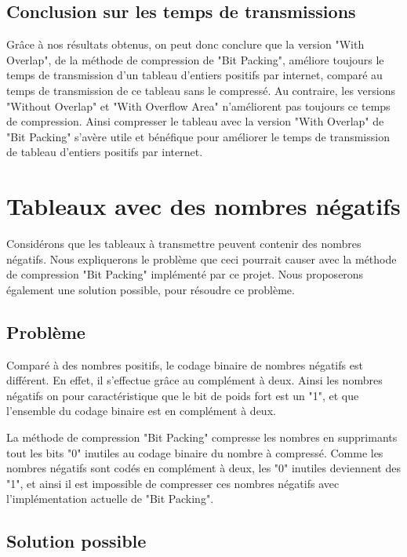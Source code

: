 \documentclass[titlepage]{article}
\begin{document}
\subsection{Conclusion sur les temps de transmissions}

Grâce à nos résultats obtenus, on peut donc conclure que la version "With Overlap", de la méthode de compression de "Bit Packing", améliore toujours le temps de transmission d'un tableau d'entiers positifs par internet, comparé au temps de transmission de ce tableau sans le compressé. Au contraire, les versions "Without Overlap" et "With Overflow Area" n'améliorent pas toujours ce temps de compression. Ainsi compresser le tableau avec la version "With Overlap" de "Bit Packing" s'avère utile et bénéfique pour améliorer le temps de transmission de tableau d'entiers positifs par internet.

\clearpage


\section{Tableaux avec des nombres négatifs}

Considérons que les tableaux à transmettre peuvent contenir des nombres négatifs. Nous expliquerons le problème que ceci pourrait causer avec la méthode de compression "Bit Packing" implémenté par ce projet. Nous proposerons également une solution possible, pour résoudre ce problème.

\subsection{Problème}

Comparé à des nombres positifs, le codage binaire de nombres négatifs est différent. En effet, il s'effectue grâce au complément à deux. Ainsi les nombres négatifs on pour caractéristique que le bit de poids fort est un "1", et que l'ensemble du codage binaire est en complément à deux.
\par La méthode de compression "Bit Packing" compresse les nombres en supprimants tout les bits "0" inutiles au codage binaire du nombre à compressé. Comme les nombres négatifs sont codés en complément à deux, les "0" inutiles deviennent des "1", et ainsi il est impossible de compresser ces nombres négatifs avec l'implémentation actuelle de "Bit Packing".

\subsection{Solution possible}
\end{document}
